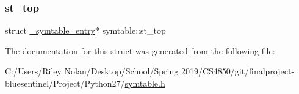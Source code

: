 \subsubsection{\texorpdfstring{st\_top}{st\_top}}
{\footnotesize\ttfamily struct \mbox{\hyperlink{struct__symtable__entry}{\+\_\+symtable\+\_\+entry}}$\ast$ symtable\+::st\+\_\+top}



The documentation for this struct was generated from the following file\+:\begin{DoxyCompactItemize}
\item 
C\+:/\+Users/\+Riley Nolan/\+Desktop/\+School/\+Spring 2019/\+C\+S4850/git/finalproject-\/bluesentinel/\+Project/\+Python27/\mbox{\hyperlink{symtable_8h}{symtable.\+h}}\end{DoxyCompactItemize}
